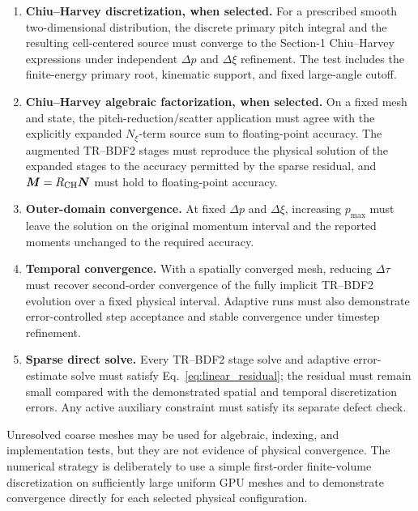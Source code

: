 \documentclass[11pt]{article}
\begin{document}
\begin{enumerate}
 \item \textbf{Chiu--Harvey discretization, when selected.}
       For a prescribed smooth two-dimensional distribution, the discrete primary pitch
       integral and the resulting cell-centered source must converge to the Section-1
       Chiu--Harvey expressions under independent $\Delta p$ and $\Delta\xi$ refinement.
       The test includes the finite-energy primary root, kinematic support, and fixed
       large-angle cutoff.

 \item \textbf{Chiu--Harvey algebraic factorization, when selected.}
       On a fixed mesh and state, the pitch-reduction/scatter application must agree with
       the explicitly expanded $N_\xi$-term source sum to floating-point accuracy.  The
       augmented TR--BDF2 stages must reproduce the physical solution of the expanded
       stages to the accuracy permitted by the sparse residual, and
       $\bm M=R_{\rm CH}\bm N$ must hold to floating-point accuracy.

 \item \textbf{Outer-domain convergence.}
       At fixed $\Delta p$ and $\Delta\xi$, increasing $p_{\max}$ must leave the solution
       on the original momentum interval and the reported moments unchanged to the
       required accuracy.

 \item \textbf{Temporal convergence.}
       With a spatially converged mesh, reducing $\Delta\tau$ must recover second-order
       convergence of the fully implicit TR--BDF2 evolution over a fixed physical
       interval.  Adaptive runs must also demonstrate error-controlled step acceptance
       and stable convergence under timestep refinement.

 \item \textbf{Sparse direct solve.}
       Every TR--BDF2 stage solve and adaptive error-estimate solve must satisfy
       Eq.~\eqref{eq:linear_residual}; the residual must remain small compared with the
       demonstrated spatial and temporal discretization errors.  Any active auxiliary
       constraint must satisfy its separate defect check.
\end{enumerate}

Unresolved coarse meshes may be used for algebraic, indexing, and implementation tests,
but they are not evidence of physical convergence.  The numerical strategy is deliberately to use a simple first-order finite-volume
discretization on sufficiently large uniform GPU meshes and to demonstrate convergence
directly for each selected physical configuration.
\end{document}
